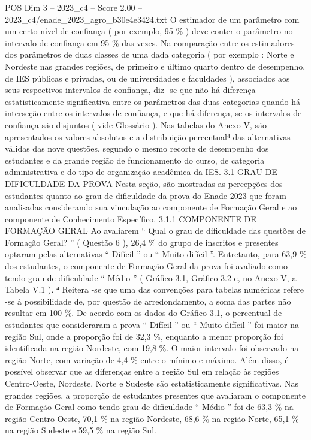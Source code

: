 \begin{textsample}{POS Dim 3 – 2023\_c4 – Score 2.00 – 2023\_c4/enade\_2023\_agro\_b30e4e3424.txt}
O estimador de um parâmetro com um certo nível de confiança ( por exemplo, 95 \% ) deve conter o parâmetro no intervalo de confiança em 95 \% das vezes.
Na comparação entre os estimadores dos parâmetros de duas classes de uma dada categoria ( por exemplo : Norte e Nordeste nas grandes regiões, de primeiro e último quarto dentro de desempenho, de IES públicas e privadas, ou de universidades e faculdades ), associados aos seus respectivos intervalos de confiança, diz -se que não há diferença estatisticamente significativa entre os parâmetros das duas categorias quando há interseção entre os intervalos de confiança, e que há diferença, se os intervalos de confiança são disjuntos ( vide Glossário ).
Nas tabelas do Anexo V, são apresentados os valores absolutos e a distribuição percentual⁴ das alternativas válidas das nove questões, segundo o mesmo recorte de desempenho dos estudantes e da grande região de funcionamento do curso, de categoria administrativa e do tipo de organização acadêmica da IES. 3.1 GRAU DE DIFICULDADE DA PROVA Nesta seção, são mostradas as percepções dos estudantes quanto ao grau de dificuldade da prova do Enade 2023 que foram analisadas considerando sua vinculação ao componente de Formação Geral e ao componente de Conhecimento Específico. 3.1.1 COMPONENTE DE FORMAÇÃO GERAL Ao avaliarem “ Qual o grau de dificuldade das questões de Formação Geral? ” ( Questão 6 ), 26,4 \% do grupo de inscritos e presentes optaram pelas alternativas “ Difícil ” ou “ Muito difícil ”.
Entretanto, para 63,9 \% dos estudantes, o componente de Formação Geral da prova foi avaliado como tendo grau de dificuldade “ Médio ” ( Gráfico 3.1, Gráfico 3.2 e, no Anexo V, a Tabela V.1 ). ⁴ Reitera -se que uma das convenções para tabelas numéricas refere -se à possibilidade de, por questão de arredondamento, a soma das partes não resultar em 100 \%.
De acordo com os dados do Gráfico 3.1, o percentual de estudantes que consideraram a prova “ Difícil ” ou “ Muito difícil ” foi maior na região Sul, onde a proporção foi de 32,3 \%, enquanto a menor proporção foi identificada na região Nordeste, com 19,8 \%.
O maior intervalo foi observado na região Norte, com variação de 4,4 \% entre o mínimo e máximo.
Além disso, é possível observar que as diferenças entre a região Sul em relação às regiões Centro-Oeste, Nordeste, Norte e Sudeste são estatisticamente significativas.
Nas grandes regiões, a proporção de estudantes presentes que avaliaram o componente de Formação Geral como tendo grau de dificuldade “ Médio ” foi de 63,3 \% na região Centro-Oeste, 70,1 \% na região Nordeste, 68,6 \% na região Norte, 65,1 \% na região Sudeste e 59,5 \% na região Sul.

\end{textsample}
